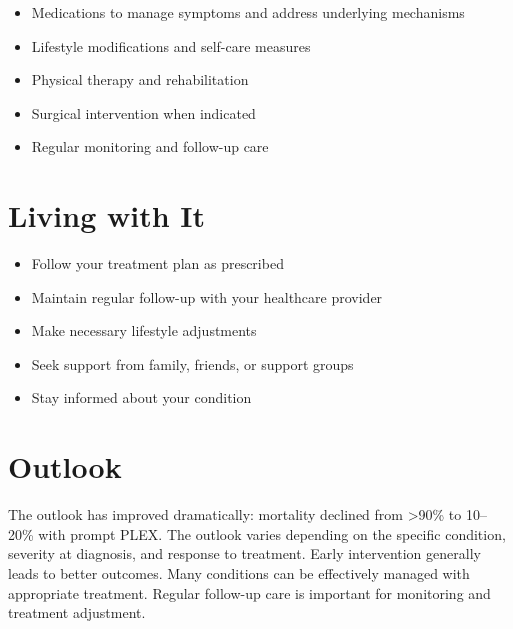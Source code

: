 \begin{itemize}[noitemsep]
  \item Medications to manage symptoms and address underlying mechanisms
  \item Lifestyle modifications and self-care measures
  \item Physical therapy and rehabilitation
  \item Surgical intervention when indicated
  \item Regular monitoring and follow-up care
\end{itemize}
\section{Living with It}
\begin{itemize}[noitemsep]
  \item Follow your treatment plan as prescribed
  \item Maintain regular follow-up with your healthcare provider
  \item Make necessary lifestyle adjustments
  \item Seek support from family, friends, or support groups
  \item Stay informed about your condition
\end{itemize}
\section{Outlook}
The outlook has improved dramatically: mortality declined from >90\% to 10--20\% with prompt PLEX. The outlook varies depending on the specific condition, severity at diagnosis, and response to treatment. Early intervention generally leads to better outcomes. Many conditions can be effectively managed with appropriate treatment. Regular follow-up care is important for monitoring and treatment adjustment.
